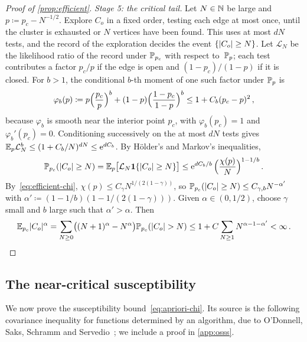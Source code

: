 \begin{proof}[Proof of \cref{prop:efficient}]
\emph{Stage 5: the critical tail.} Let $N\in\mathbb N$ be large and $p\coloneqq p_c-N^{-1/2}$. Explore $C_o$ in
a fixed order, testing each edge at most once, until the cluster is exhausted or $N$ vertices have been
found. This uses at most $dN$ tests, and the record of the exploration decides the event
$\{\lvert C_o\rvert\ge N\}$. Let $\mathcal L_N$ be the likelihood ratio of the record under $\mathbb P_{p_c}$ with
respect to~$\mathbb P_p$; each test contributes a factor $p_c/p$ if the edge is open and $(1-p_c)/(1-p)$ if it
is closed. For $b>1$, the conditional $b$-th moment of one such factor under $\mathbb P_p$ is
\begin{equation*}
  \varphi_b(p)\coloneqq p\Bigl(\frac{p_c}p\Bigr)^b+(1-p)\Bigl(\frac{1-p_c}{1-p}\Bigr)^b
  \le1+C_b(p_c-p)^2\,,
\end{equation*}
because $\varphi_b$ is smooth near the interior point $p_c$, with $\varphi_b(p_c)=1$ and
$\varphi_b'(p_c)=0$. Conditioning successively on the at most $dN$ tests gives
$\mathbb E_p\mathcal L_N^b\le(1+C_b/N)^{dN}\le\mathrm{e}^{dC_b}$. By Hölder's and Markov's inequalities,
\begin{equation*}
  \mathbb P_{p_c}(\lvert C_o\rvert\ge N)=\mathbb E_p\bigl[\mathcal L_N\mathbf{1}\{\lvert C_o\rvert\ge N\}\bigr]
  \le\mathrm{e}^{dC_b/b}\,\Bigl(\frac{\chi(p)}{N}\Bigr)^{1-1/b}\,.
\end{equation*}
By~\eqref{eq:efficient-chi}, $\chi(p)\le C_\gamma N^{1/(2(1-\gamma))}$, so
$\mathbb P_{p_c}(\lvert C_o\rvert\ge N)\le C_{\gamma,b}N^{-\alpha'}$ with
$\alpha'\coloneqq(1-1/b)(1-1/(2(1-\gamma)))$. Given $\alpha\in(0,1/2)$, choose $\gamma$ small and $b$
large such that $\alpha'>\alpha$. Then
\begin{equation*}
  \mathbb E_{p_c}\lvert C_o\rvert^\alpha=\sum_{N\ge0}\bigl((N+1)^\alpha-N^\alpha\bigr)\mathbb P_{p_c}(\lvert C_o\rvert>N)
  \le1+C\sum_{N\ge1}N^{\alpha-1-\alpha'}<\infty\,.\qedhere
\end{equation*}
\end{proof}

\subsection{The near-critical susceptibility}\label{sec:chi}

We now prove the susceptibility bound~\eqref{eq:apriori-chi}. Its source is the following covariance
inequality for functions determined by an algorithm, due to O'Donnell, Saks, Schramm and
Servedio~\cite[Section~3.3, Equation~(6)]{OSSS05}; we include a proof in \cref{app:osss}.

